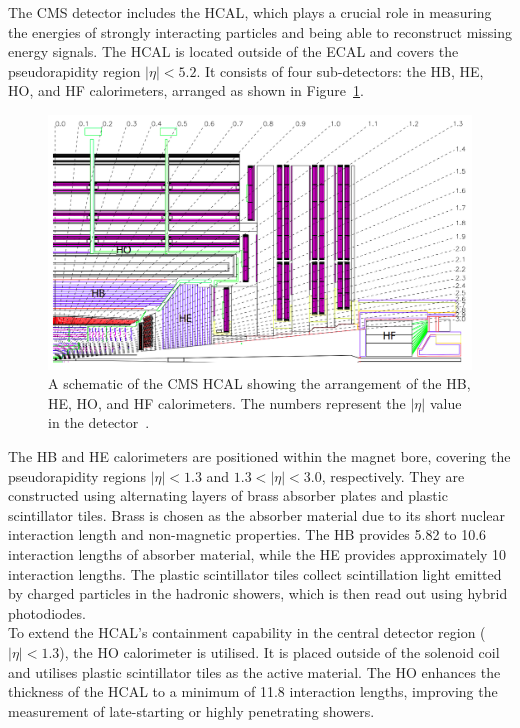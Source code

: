 The \ac{CMS} detector includes the \ac{HCAL}, which plays a crucial role in measuring the energies of strongly interacting particles and being able to reconstruct missing energy signals. 
The \ac{HCAL} is located outside of the \ac{ECAL} and covers the pseudorapidity region $|\eta| < 5.2$. 
It consists of four sub-detectors: the \ac{HB}, \ac{HE}, \ac{HO}, and \ac{HF} calorimeters, arranged as shown in Figure~\ref{fig:hcal}.

\begin{figure}[!hbtp]
    \centering
    \includegraphics[width=\textwidth]{Figures/HCAL.png}
    \caption{A schematic of the CMS HCAL showing the arrangement of the HB, HE, HO, and HF calorimeters. The numbers represent the $|\eta|$ value in the detector~\cite{CMS_Setup}.}
    \label{fig:hcal}
\end{figure}

The \ac{HB} and \ac{HE} calorimeters are positioned within the magnet bore, covering the pseudorapidity regions $|\eta| < 1.3$ and $1.3 < |\eta| < 3.0$, respectively. 
They are constructed using alternating layers of brass absorber plates and plastic scintillator tiles. 
Brass is chosen as the absorber material due to its short nuclear interaction length and non-magnetic properties. 
The \ac{HB} provides 5.82 to 10.6 interaction lengths of absorber material, while the \ac{HE} provides approximately 10 interaction lengths. 
The plastic scintillator tiles collect scintillation light emitted by charged particles in the hadronic showers, which is then read out using hybrid photodiodes. \\

To extend the \ac{HCAL}'s containment capability in the central detector region ($|\eta| < 1.3$), the \ac{HO} calorimeter is utilised. 
It is placed outside of the solenoid coil and utilises plastic scintillator tiles as the active material. 
The \ac{HO} enhances the thickness of the \ac{HCAL} to a minimum of 11.8 interaction lengths, improving the measurement of late-starting or highly penetrating showers. \\

